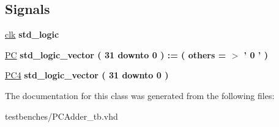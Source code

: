 \subsection*{\-Signals}
 \begin{DoxyCompactItemize}
\item 
\hypertarget{class_p_c_adder__tb_1_1behavior_ad58a2240944eedcee02839cbcf3f871b}{\hyperlink{class_p_c_adder__tb_1_1behavior_ad58a2240944eedcee02839cbcf3f871b}{clk} {\bfseries std\-\_\-logic } }\label{class_p_c_adder__tb_1_1behavior_ad58a2240944eedcee02839cbcf3f871b}

\item 
\hypertarget{class_p_c_adder__tb_1_1behavior_a41945ec3325c2b38b7618dd164dbc2ef}{\hyperlink{class_p_c_adder__tb_1_1behavior_a41945ec3325c2b38b7618dd164dbc2ef}{\-P\-C} {\bfseries std\-\_\-logic\-\_\-vector (   31    downto    0  )  \-:= (  others  = $>$ '  0  '  ) } }\label{class_p_c_adder__tb_1_1behavior_a41945ec3325c2b38b7618dd164dbc2ef}

\item 
\hypertarget{class_p_c_adder__tb_1_1behavior_a6e9bc854a8af2389b8d808375c044d2f}{\hyperlink{class_p_c_adder__tb_1_1behavior_a6e9bc854a8af2389b8d808375c044d2f}{\-P\-C4} {\bfseries std\-\_\-logic\-\_\-vector (   31    downto    0  ) } }\label{class_p_c_adder__tb_1_1behavior_a6e9bc854a8af2389b8d808375c044d2f}

\end{DoxyCompactItemize}


\-The documentation for this class was generated from the following files\-:\begin{DoxyCompactItemize}
\item 
testbenches/\-P\-C\-Adder\-\_\-tb.\-vhd\end{DoxyCompactItemize}
